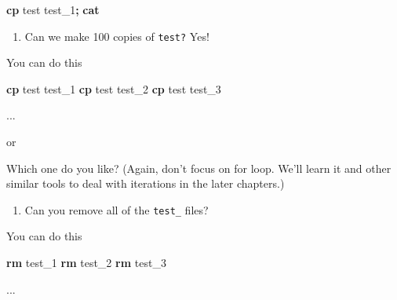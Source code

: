 \documentclass[
]{book}
\newenvironment{Shaded}{\begin{snugshade}}{\end{snugshade}}
\newcommand{\ControlFlowTok}[1]{\textcolor[rgb]{0.13,0.29,0.53}{\textbf{#1}}}
\newcommand{\DataTypeTok}[1]{\textcolor[rgb]{0.13,0.29,0.53}{#1}}
\newcommand{\DecValTok}[1]{\textcolor[rgb]{0.00,0.00,0.81}{#1}}
\newcommand{\ExtensionTok}[1]{#1}
\newcommand{\FunctionTok}[1]{\textcolor[rgb]{0.13,0.29,0.53}{\textbf{#1}}}
\newcommand{\KeywordTok}[1]{\textcolor[rgb]{0.13,0.29,0.53}{\textbf{#1}}}
\newcommand{\NormalTok}[1]{#1}
\newcommand{\StringTok}[1]{\textcolor[rgb]{0.31,0.60,0.02}{#1}}
\newcommand{\VariableTok}[1]{\textcolor[rgb]{0.00,0.00,0.00}{#1}}
\providecommand{\tightlist}{%
  \setlength{\itemsep}{0pt}\setlength{\parskip}{0pt}}
\begin{document}
\begin{Shaded}
\begin{Highlighting}[]
\FunctionTok{cp}\NormalTok{ test test\_1}\KeywordTok{;} \FunctionTok{cat}
\end{Highlighting}
\end{Shaded}

\begin{enumerate}
\def\labelenumi{\arabic{enumi}.}
\setcounter{enumi}{1}
\tightlist
\item
  Can we make 100 copies of \texttt{test?} Yes!
\end{enumerate}

You can do this

\begin{Shaded}
\begin{Highlighting}[]
\FunctionTok{cp}\NormalTok{ test test\_1}
\FunctionTok{cp}\NormalTok{ test test\_2}
\FunctionTok{cp}\NormalTok{ test test\_3}

\ExtensionTok{...}
\end{Highlighting}
\end{Shaded}

or

\begin{Shaded}
\end{Shaded}

Which one do you like? (Again, don't focus on for loop. We'll learn it and other similar tools to deal with iterations in the later chapters.)

\begin{enumerate}
\def\labelenumi{\arabic{enumi}.}
\setcounter{enumi}{2}
\tightlist
\item
  Can you remove all of the \texttt{test\_} files?
\end{enumerate}

You can do this

\begin{Shaded}
\begin{Highlighting}[]
\FunctionTok{rm}\NormalTok{ test\_1}
\FunctionTok{rm}\NormalTok{ test\_2}
\FunctionTok{rm}\NormalTok{ test\_3}

\ExtensionTok{...}
\end{Highlighting}
\end{Shaded}
\end{document}
